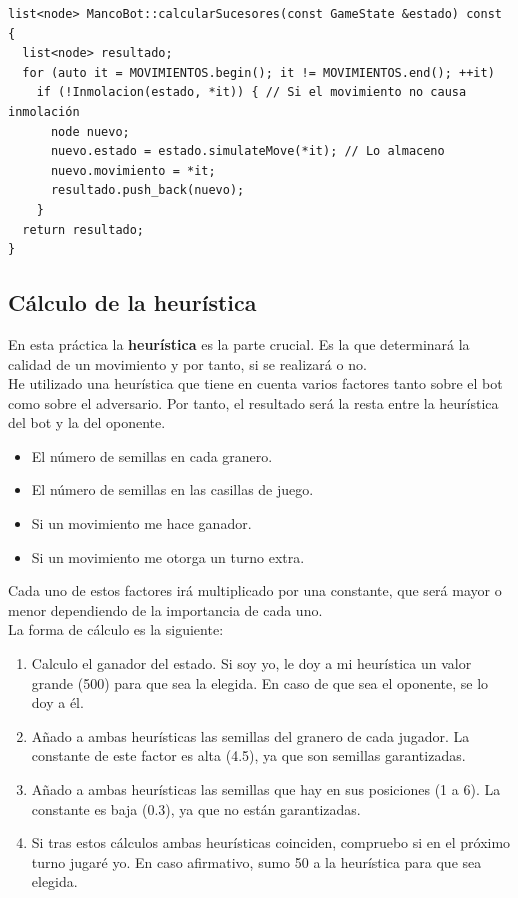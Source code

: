 \documentclass[12pt,spanish]{article}
\begin{document}
\begin{verbatim}
list<node> MancoBot::calcularSucesores(const GameState &estado) const {
  list<node> resultado;
  for (auto it = MOVIMIENTOS.begin(); it != MOVIMIENTOS.end(); ++it) 
    if (!Inmolacion(estado, *it)) { // Si el movimiento no causa inmolación
      node nuevo;
      nuevo.estado = estado.simulateMove(*it); // Lo almaceno
      nuevo.movimiento = *it;
      resultado.push_back(nuevo);
    }
  return resultado;
}
\end{verbatim}	



\newpage

\subsection{Cálculo de la heurística}

En esta práctica la \textbf{heurística} es la parte crucial. Es la que determinará la calidad de un movimiento y por tanto, si se realizará o no.\\

He utilizado una heurística que tiene en cuenta varios factores tanto sobre el bot como sobre el adversario. Por tanto, el resultado será la resta entre la heurística del bot y la del oponente.

\begin{itemize}
	\item El número de semillas en cada granero.
	\item El número de semillas en las casillas de juego.
	\item Si un movimiento me hace ganador.
	\item Si un movimiento me otorga un turno extra.
\end{itemize}

Cada uno de estos factores irá multiplicado por una constante, que será mayor o menor dependiendo de la importancia de cada uno.\\

La forma de cálculo es la siguiente:

\begin{enumerate}
	\item Calculo el ganador del estado. Si soy yo, le doy a mi heurística un valor grande (500) para que sea la elegida. En caso de que sea el oponente, se lo doy a él.
	\item Añado a ambas heurísticas las semillas del granero de cada jugador. La constante de este factor es alta (4.5), ya que son semillas garantizadas.
	\item Añado a ambas heurísticas las semillas que hay en sus posiciones (1 a 6). La constante es baja (0.3), ya que no están garantizadas.
	\item Si tras estos cálculos ambas heurísticas coinciden, compruebo si en el próximo turno jugaré yo. En caso afirmativo, sumo 50 a la heurística para que sea elegida.
\end{enumerate}
\end{document}
